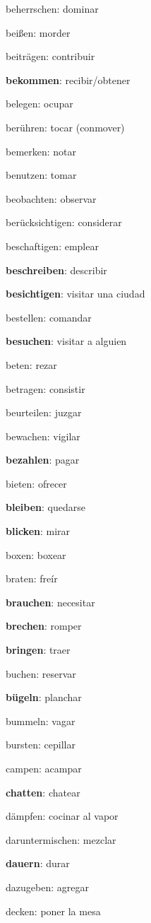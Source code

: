 \begin{multicols}{2}
\begin{myitemize}
\item beherrschen: dominar
\item beißen: morder
\item beiträgen: contribuir
\item \textbf{bekommen}: recibir/obtener
\item belegen: ocupar
\item berühren: tocar (conmover)
\item bemerken: notar
\item benutzen: tomar
\item beobachten: observar
\item berücksichtigen: considerar
\item beschaftigen: emplear
\item \textbf{beschreiben}: describir
\item \textbf{besichtigen}: visitar una ciudad
\item bestellen: comandar
\item \textbf{besuchen}: visitar a alguien
\item beten: rezar
\item betragen: consistir
\item beurteilen: juzgar
\item bewachen: vigilar
\item \textbf{bezahlen}: pagar
\item bieten: ofrecer
\item \textbf{bleiben}: quedarse
\item \textbf{blicken}: mirar
\item boxen: boxear
\item braten: freír
\item \textbf{brauchen}: necesitar
\item \textbf{brechen}: romper
\item \textbf{bringen}: traer
\item buchen: reservar
\item \textbf{bügeln}: planchar
\item bummeln: vagar
\item bursten: cepillar
\item campen: acampar
\item \textbf{chatten}: chatear
\item dämpfen: cocinar al vapor
\item daruntermischen: mezclar
\item \textbf{dauern}: durar
\item dazugeben: agregar
\item decken: poner la mesa

\end{myitemize}
\end{multicols}
